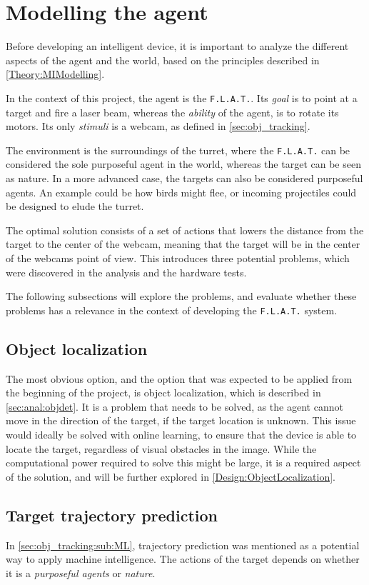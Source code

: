 \section{Modelling the agent}\label{Design:MI}
Before developing an intelligent device, it is important to analyze the different aspects of the agent and the world, based on the principles described in \autoref{Theory:MIModelling}.

In the context of this project, the agent is the \texttt{F.L.A.T.}.
Its \textit{goal} is to point at a target and fire a laser beam, whereas the \textit{ability} of the agent, is to rotate its motors.
Its only \textit{stimuli} is a webcam, as defined in \autoref{sec:obj_tracking}.

The environment is the surroundings of the turret, where the \texttt{F.L.A.T.} can be considered the sole purposeful agent in the world, whereas the target can be seen as nature.
In a more advanced case, the targets can also be considered purposeful agents.
An example could be how birds might flee, or incoming projectiles could be designed to elude the turret.

The optimal solution consists of a set of actions that lowers the distance from the target to the center of the webcam, meaning that the target will be in the center of the webcams point of view.
This introduces three potential problems, which were discovered in the analysis and the hardware tests.

The following subsections will explore the problems, and evaluate whether these problems has a relevance in the context of developing the \texttt{F.L.A.T.} system. 


\subsection{Object localization}
The most obvious option, and the option that was expected to be applied from the beginning of the project, is object localization, which is described in \autoref{sec:anal:objdet}.
It is a problem that needs to be solved, as the agent cannot move in the direction of the target, if the target location is unknown.
This issue would ideally be solved with online learning, to ensure that the device is able to locate the target, regardless of visual obstacles in the image.
While the computational power required to solve this might be large, it is a required aspect of the solution, and will be further explored in \autoref{Design:ObjectLocalization}.

\subsection{Target trajectory prediction}
In \autoref{sec:obj_tracking:sub:ML}, trajectory prediction was mentioned as a potential way to apply machine intelligence.
The actions of the target depends on whether it is a \textit{purposeful agents} or \textit{nature}.

